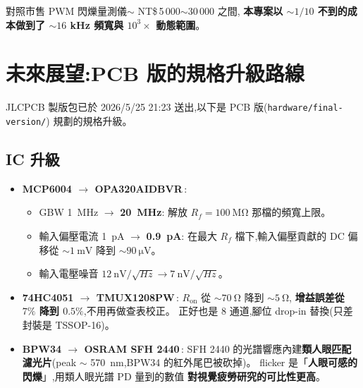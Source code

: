 \documentclass[12pt,a4paper]{article}
\begin{document}
對照市售 PWM 閃爍量測儀\(\sim \) NT\$\,5\,000\(\sim 30\,000\) 之間,
\textbf{本專案以 \(\sim 1/10\) 不到的成本做到了 \(\sim 16\) kHz 頻寬與
	\(10^3 \times\) 動態範圍}。

\section{未來展望:PCB 版的規格升級路線}
\label{sec:future}

JLCPCB 製版包已於 2026/5/25 21:23 送出,以下是 PCB 版(\texttt{hardware/final-version/})
規劃的規格升級。

\subsection{IC 升級}

\begin{itemize}[leftmargin=2em,itemsep=0pt]
	\item \textbf{MCP6004 \(\to\) OPA320AIDBVR}\,\cite{OPA320Datasheet}:
	      \begin{itemize}[leftmargin=1em,itemsep=0pt]
		      \item GBW \SI{1}{\mega\hertz} \(\to\) \textbf{\SI{20}{\mega\hertz}}:
		            解放 \(R_f = \SI{100}{\mega\ohm}\) 那檔的頻寬上限。
		      \item 輸入偏壓電流 \SI{1}{\pico\ampere} \(\to\) \textbf{\SI{0.9}{\pico\ampere}}:
		            在最大 \(R_f\) 檔下,輸入偏壓貢獻的 DC 偏移從 \(\sim \SI{1}{\milli\volt}\)
		            降到 \(\sim \SI{90}{\micro\volt}\)。
		      \item 輸入電壓噪音 \(\SI{12}{\nano\volt/\sqrt{Hz}} \to \SI{7}{\nano\volt/\sqrt{Hz}}\)。
	      \end{itemize}
	\item \textbf{74HC4051 \(\to\) TMUX1208PW}\,\cite{TMUX1208Datasheet}:
	      \(R_\text{on}\) 從 \(\sim \SI{70}{\ohm}\) 降到 \(\sim \SI{5}{\ohm}\),
	      \textbf{增益誤差從 \(7\%\) 降到 \(0.5\%\)},不用再做查表校正。
	      正好也是 8 通道,腳位 drop-in 替換(只差封裝是 TSSOP-16)。
	\item \textbf{BPW34 \(\to\) OSRAM SFH 2440}\,\cite{SFH2440Datasheet}:
	      SFH 2440 的光譜響應內建\textbf{類人眼匹配濾光片}(peak \(\sim\)
	      \SI{570}{\nano\meter},BPW34 的紅外尾巴被砍掉)。
	      flicker 是「\textbf{人眼可感的閃爍}」,用類人眼光譜 PD 量到的數值
	      \textbf{對視覺疲勞研究的可比性更高}。
\end{itemize}
\end{document}
